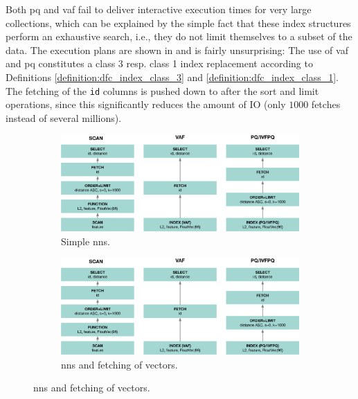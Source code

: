 Both \acrshort{pq} and \acrshort{vaf} fail to deliver interactive execution times for very large collections, which can be explained by  the simple fact that these index structures perform an exhaustive search, i.e., they do not limit themselves to a subset of the data. The execution plans are shown in  and is fairly unsurprising: The use of \acrshort{vaf} and \acrshort{pq} constitutes a class 3 resp. class 1 index replacement according to Definitions \ref{definition:dfc_index_class_3} and \ref{definition:dfc_index_class_1}. The fetching of the \texttt{id} columns is pushed down to after the sort and limit operations, since this significantly reduces the amount of IO (only $1000$ fetches instead of several millions).

\begin{figure}[p]
    \centering
    \begin{subfigure}[b]{\textwidth}
        \centering
        \includegraphics[width=\textwidth]{figures/bignns/cottontail/query-plan-nns}
        \caption{Simple \acrshort{nns}.}
        \label{figure:cottontail_nns_plan}
    \end{subfigure}
    \hfill
    \centering
    \begin{subfigure}[b]{\textwidth}
        \centering
        \includegraphics[width=\textwidth]{figures/bignns/cottontail/query-plan-nns}
        \caption{\acrshort{nns} and fetching of vectors.}
        \label{figure:cottontail_nns_fetch_plan}
    \end{subfigure}

\end{figure}

